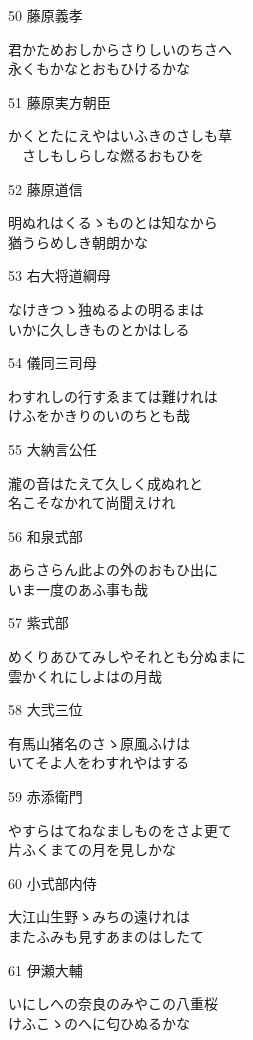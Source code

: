 \begin{shiika}
\end{shiika}50 藤原義孝     \begin{shiika}君かためおしからさりしいのちさへ\\永くもかなとおもひけるかな 
\end{shiika}51 藤原実方朝臣 \begin{shiika}かくとたにえやはいふきのさしも草\\　さしもしらしな燃るおもひを 
\end{shiika}52 藤原道信     \begin{shiika}明ぬれはくるゝものとは知なから\\猶うらめしき朝朗かな 
\end{shiika}53 右大将道綱母 \begin{shiika}なけきつゝ独ぬるよの明るまは\\いかに久しきものとかはしる 
\end{shiika}54 儀同三司母   \begin{shiika}わすれしの行すゑまては難けれは\\けふをかきりのいのちとも哉 
\end{shiika}55 大納言公任   \begin{shiika}瀧の音はたえて久しく成ぬれと\\名こそなかれて尚聞えけれ 
\end{shiika}56 和泉式部     \begin{shiika}あらさらん此よの外のおもひ出に\\いま一度のあふ事も哉 
\end{shiika}57 紫式部       \begin{shiika}めくりあひてみしやそれとも分ぬまに\\雲かくれにしよはの月哉 
\end{shiika}58 大弐三位     \begin{shiika}有馬山猪名のさゝ原風ふけは\\いてそよ人をわすれやはする 
\end{shiika}59 赤添衛門     \begin{shiika}やすらはてねなましものをさよ更て\\片ふくまての月を見しかな 
\end{shiika}60 小式部内侍   \begin{shiika}大江山生野ゝみちの遠けれは\\またふみも見すあまのはしたて 
\end{shiika}61 伊瀬大輔     \begin{shiika}いにしへの奈良のみやこの八重桜\\けふこゝのへに匂ひぬるかな 

\end{shiika}
